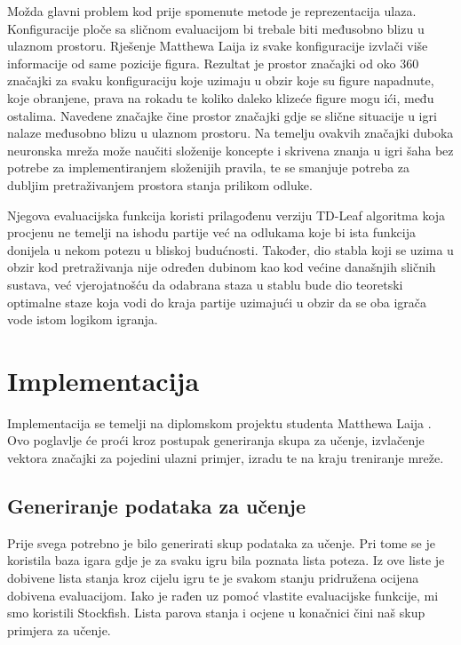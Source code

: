 \documentclass[journal]{IEEEtran}
\begin{document}
Možda glavni problem kod prije spomenute metode je reprezentacija ulaza. Konfiguracije ploče sa sličnom evaluacijom bi trebale biti međusobno blizu u ulaznom prostoru. Rješenje Matthewa Laija iz svake konfiguracije izvlači više informacije od same pozicije figura. Rezultat je prostor značajki od oko 360 značajki za svaku konfiguraciju koje uzimaju u obzir koje su figure napadnute, koje obranjene, prava na rokadu te koliko daleko klizeće figure mogu ići, među ostalima. Navedene značajke čine prostor značajki gdje se slične situacije u igri nalaze međusobno blizu u ulaznom prostoru. Na temelju ovakvih značajki duboka neuronska mreža može naučiti složenije koncepte i skrivena znanja u igri šaha bez potrebe za implementiranjem složenijih pravila, te se smanjuje potreba za dubljim pretraživanjem prostora stanja prilikom odluke.

Njegova evaluacijska funkcija koristi prilagođenu verziju TD-Leaf algoritma koja procjenu ne temelji na ishodu partije već na odlukama koje bi ista funkcija donijela u nekom potezu u bliskoj budućnosti. Također, dio stabla koji se uzima u obzir kod pretraživanja nije određen dubinom kao kod većine današnjih sličnih sustava, već vjerojatnošću da odabrana staza u stablu bude dio teoretski optimalne staze koja vodi do kraja partije uzimajući u obzir da se oba igrača vode istom logikom igranja.



\section{Implementacija}
Implementacija se temelji na diplomskom projektu studenta Matthewa Laija \cite{giraffe}. Ovo poglavlje će proći kroz postupak generiranja skupa za učenje, izvlačenje vektora značajki za pojedini ulazni primjer, izradu te na kraju treniranje mreže.
\subsection{Generiranje podataka za učenje}
Prije svega potrebno je bilo generirati skup podataka za učenje. Pri tome se je koristila baza igara gdje je za svaku igru bila poznata lista poteza. Iz ove liste je dobivene lista stanja kroz cijelu igru te je svakom stanju pridružena ocijena dobivena evaluacijom. Iako je \cite{giraffe} rađen uz pomoć vlastite evaluacijske funkcije, mi smo koristili Stockfish. Lista parova stanja i ocjene u konačnici čini naš skup primjera za učenje.
\end{document}
